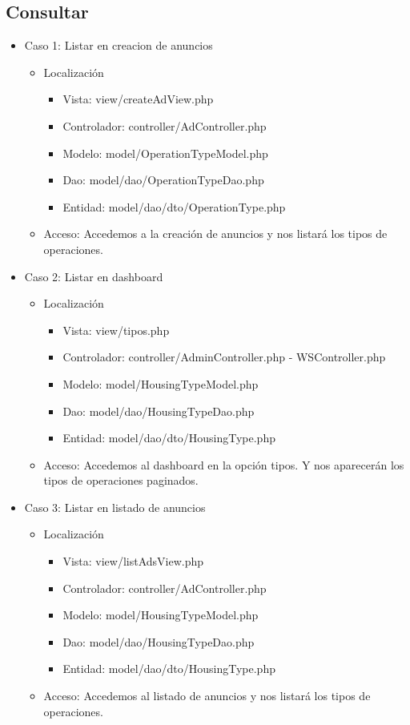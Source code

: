 \subsection{Consultar}
\begin{itemize}
\item Caso 1: Listar en creacion de anuncios
\begin{itemize}
\item Localizaci\'{o}n
\begin{itemize}
\item Vista: view/createAdView.php
\item Controlador: controller/AdController.php
\item Modelo: model/OperationTypeModel.php
\item Dao: model/dao/OperationTypeDao.php
\item Entidad: model/dao/dto/OperationType.php
\end{itemize}
\item Acceso: Accedemos a la creaci\'{o}n de anuncios y nos listar\'{a} los tipos de operaciones.
\end{itemize}
\item Caso 2: Listar en dashboard
\begin{itemize}
\item Localizaci\'{o}n
\begin{itemize}
\item Vista: view/tipos.php
\item Controlador: controller/AdminController.php - WSController.php
\item Modelo: model/HousingTypeModel.php
\item Dao: model/dao/HousingTypeDao.php
\item Entidad: model/dao/dto/HousingType.php
\end{itemize}
\item Acceso: Accedemos al dashboard en la opci\'{o}n tipos. Y nos aparecer\'{a}n los tipos de operaciones paginados.
\end{itemize}
\item Caso 3: Listar en listado de anuncios
\begin{itemize}
\item Localizaci\'{o}n
\begin{itemize}
\item Vista: view/listAdsView.php
\item Controlador: controller/AdController.php
\item Modelo: model/HousingTypeModel.php
\item Dao: model/dao/HousingTypeDao.php
\item Entidad: model/dao/dto/HousingType.php
\end{itemize}
\item Acceso: Accedemos al listado de anuncios y nos listar\'{a} los tipos de operaciones.
\end{itemize}
\end{itemize}


